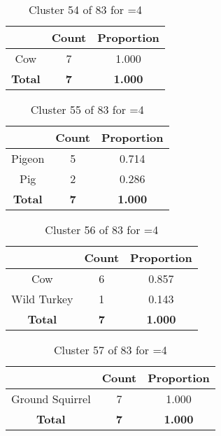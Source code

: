 \begin{table}[ht!]
\centering
\begin{tabular}{|c|c|c|}
\hline
\bf \Spec{} &\bf Count &\bf Proportion\\ \hline \hline
Cow & 7 & 1.000\\ \hline
\hline
\bf Total & \bf 7 & \bf 1.000\\ \hline
\end{tabular}
\label{tab:cluster:54:4}
\caption{Cluster 54 of 83 for \minneigh{}=4}
\end{table}

\begin{table}[ht!]
\centering
\begin{tabular}{|c|c|c|}
\hline
\bf \Spec{} &\bf Count &\bf Proportion\\ \hline \hline
Pigeon & 5 & 0.714\\ \hline
Pig & 2 & 0.286\\ \hline
\hline
\bf Total & \bf 7 & \bf 1.000\\ \hline
\end{tabular}
\label{tab:cluster:55:4}
\caption{Cluster 55 of 83 for \minneigh{}=4}
\end{table}

\begin{table}[ht!]
\centering
\begin{tabular}{|c|c|c|}
\hline
\bf \Spec{} &\bf Count &\bf Proportion\\ \hline \hline
Cow & 6 & 0.857\\ \hline
Wild Turkey & 1 & 0.143\\ \hline
\hline
\bf Total & \bf 7 & \bf 1.000\\ \hline
\end{tabular}
\label{tab:cluster:56:4}
\caption{Cluster 56 of 83 for \minneigh{}=4}
\end{table}

\begin{table}[ht!]
\centering
\begin{tabular}{|c|c|c|}
\hline
\bf \Spec{} &\bf Count &\bf Proportion\\ \hline \hline
Ground Squirrel & 7 & 1.000\\ \hline
\hline
\bf Total & \bf 7 & \bf 1.000\\ \hline
\end{tabular}
\label{tab:cluster:57:4}
\caption{Cluster 57 of 83 for \minneigh{}=4}
\end{table}

